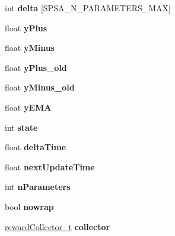 \begin{DoxyCompactItemize}
\item 
\hypertarget{structSPSALearning__t_a17084cf0f5a0beddb771b386e1ed5e75}{
int {\bfseries delta} \mbox{[}SPSA\_\-N\_\-PARAMETERS\_\-MAX\mbox{]}}
\label{structSPSALearning__t_a17084cf0f5a0beddb771b386e1ed5e75}

\item 
\hypertarget{structSPSALearning__t_a10e736df9356e663312c32d4fd524f99}{
float {\bfseries yPlus}}
\label{structSPSALearning__t_a10e736df9356e663312c32d4fd524f99}

\item 
\hypertarget{structSPSALearning__t_a5bd764616cd9249a57dfefb8e295a547}{
float {\bfseries yMinus}}
\label{structSPSALearning__t_a5bd764616cd9249a57dfefb8e295a547}

\item 
\hypertarget{structSPSALearning__t_aa3237274084059b17615f5dbdee7c580}{
float {\bfseries yPlus\_\-old}}
\label{structSPSALearning__t_aa3237274084059b17615f5dbdee7c580}

\item 
\hypertarget{structSPSALearning__t_affbb0b145a9feca43ab4e20f7201acd0}{
float {\bfseries yMinus\_\-old}}
\label{structSPSALearning__t_affbb0b145a9feca43ab4e20f7201acd0}

\item 
\hypertarget{structSPSALearning__t_af0dd32d5c5b53114fabda1e3fc6fc67e}{
float {\bfseries yEMA}}
\label{structSPSALearning__t_af0dd32d5c5b53114fabda1e3fc6fc67e}

\item 
\hypertarget{structSPSALearning__t_a217b05bcb058420445d7a4e0b2e14607}{
int {\bfseries state}}
\label{structSPSALearning__t_a217b05bcb058420445d7a4e0b2e14607}

\item 
\hypertarget{structSPSALearning__t_a7bea8974895362b124efa98ab63d26cf}{
float {\bfseries deltaTime}}
\label{structSPSALearning__t_a7bea8974895362b124efa98ab63d26cf}

\item 
\hypertarget{structSPSALearning__t_ab7a9a2856d65901afd1639300bc538f9}{
float {\bfseries nextUpdateTime}}
\label{structSPSALearning__t_ab7a9a2856d65901afd1639300bc538f9}

\item 
\hypertarget{structSPSALearning__t_a2c39b7b8eeff842bd1649b3bd0554f9a}{
int {\bfseries nParameters}}
\label{structSPSALearning__t_a2c39b7b8eeff842bd1649b3bd0554f9a}

\item 
\hypertarget{structSPSALearning__t_a8c801dbe464be1921d0b33f82837299b}{
bool {\bfseries nowrap}}
\label{structSPSALearning__t_a8c801dbe464be1921d0b33f82837299b}

\item 
\hypertarget{structSPSALearning__t_a2f6715d70698c2a2cba4cc61c5082a50}{
\hyperlink{structrewardCollector__t}{rewardCollector\_\-t} {\bfseries collector}}
\label{structSPSALearning__t_a2f6715d70698c2a2cba4cc61c5082a50}

\end{DoxyCompactItemize}


